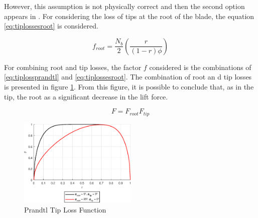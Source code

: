 However, this assumption is not physically correct and then the second option appears in \cite{leishman_principles_2006}. For considering the loss of tips at the root of the blade, the equation \ref{eq:tiplossesroot} is considered.

\begin{equation}
    f_{root} = \frac{N_b}{2} \left( \frac{r}{\left(1-r\right)\phi}\right)   
    \label{eq:tiplossesroot}
\end{equation}

For combining root and tip losses, the factor $f$ considered is the combinations of \ref{eq:tiplossprandtl} and \ref{eq:tiplossesroot}. The combination of root an d tip losses is presented in figure \ref{fig:fullprandtltiplossfunction}. From this figure, it is possible to conclude that, as in the tip, the root as a significant decrease in the lift force.

\begin{equation}
    F = F_{root}F_{tip}
\end{equation}

\begin{figure}[!htb]
    \centering
    \includegraphics[width=0.5\textwidth]{Figures/background/tiplosses/prandtltiplossfunction.eps}
    \caption{Prandtl Tip Loss Function}
    \label{fig:fullprandtltiplossfunction}
\end{figure}